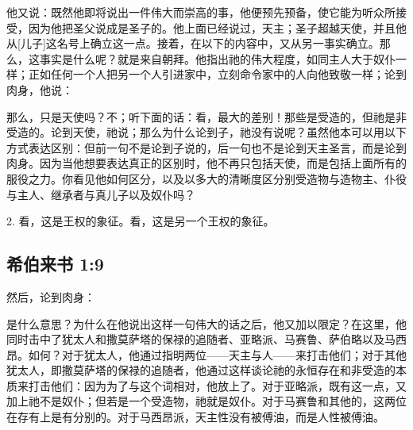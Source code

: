 他又说：既然他即将说出一件伟大而崇高的事，他便预先预备，使它能为听众所接受，因为他把圣父说成是圣子的。他上面已经说过，天主；圣子超越天使，并且他从[儿子]这名号上确立这一点。接着，在以下的内容中，又从另一事实确立。那么，这事实是什么呢？就是来自朝拜。他指出祂的伟大程度，如同主人大于奴仆一样；正如任何一个人把另一个人引进家中，立刻命令家中的人向他致敬一样；论到肉身，他说：\par

那么，只是天使吗？不；听下面的话：看，最大的差别！那些是受造的，但祂是非受造的。论到天使，祂说；那么为什么论到子，祂没有说呢？虽然他本可以用以下方式表达区别：但前一句不是论到子说的，后一句也不是论到天主圣言，而是论到肉身。因为当他想要表达真正的区别时，他不再只包括天使，而是包括上面所有的服役之力。你看见他如何区分，以及以多大的清晰度区分别受造物与造物主、仆役与主人、继承者与真儿子以及奴仆吗？\par

2. 看，这是王权的象征。看，这是另一个王权的象征。\par


\subsection{希伯来书 1:9}

然后，论到肉身：\par

是什么意思？为什么在他说出这样一句伟大的话之后，他又加以限定？在这里，他同时击中了犹太人和撒莫萨塔的保禄的追随者、亚略派、马赛鲁、萨伯略以及马西昂。如何？对于犹太人，他通过指明两位——天主与人——来打击他们；对于其他犹太人，即撒莫萨塔的保禄的追随者，他通过这样谈论祂的永恒存在和非受造的本质来打击他们：因为为了与这个词相对，他放上了。对于亚略派，既有这一点，又加上祂不是奴仆；但若是一个受造物，祂就是奴仆。对于马赛鲁和其他的，这两位在存有上是有分别的。对于马西昂派，天主性没有被傅油，而是人性被傅油。\par

